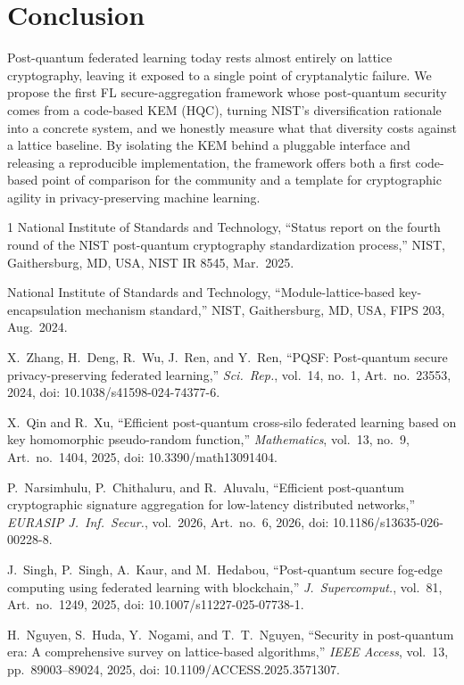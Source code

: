 \documentclass[conference]{IEEEtran}
\begin{document}
\section{Conclusion}
Post-quantum federated learning today rests almost entirely on lattice cryptography,
leaving it exposed to a single point of cryptanalytic failure. We propose the first
FL secure-aggregation framework whose post-quantum security comes from a code-based KEM
(HQC), turning NIST's diversification rationale into a concrete system, and we honestly
measure what that diversity costs against a lattice baseline. By isolating the KEM behind a
pluggable interface and releasing a reproducible implementation, the framework offers both a
first code-based point of comparison for the community and a template for cryptographic
agility in privacy-preserving machine learning.

\begin{thebibliography}{1}
National Institute of Standards and Technology, ``Status report on the fourth round of the
NIST post-quantum cryptography standardization process,'' NIST, Gaithersburg, MD, USA,
NIST IR 8545, Mar.\ 2025.

National Institute of Standards and Technology, ``Module-lattice-based key-encapsulation
mechanism standard,'' NIST, Gaithersburg, MD, USA, FIPS 203, Aug.\ 2024.

X.\ Zhang, H.\ Deng, R.\ Wu, J.\ Ren, and Y.\ Ren, ``PQSF: Post-quantum secure
privacy-preserving federated learning,'' \emph{Sci.\ Rep.}, vol.\ 14, no.\ 1, Art.\ no.\
23553, 2024, doi: 10.1038/s41598-024-74377-6.

X.\ Qin and R.\ Xu, ``Efficient post-quantum cross-silo federated learning based on key
homomorphic pseudo-random function,'' \emph{Mathematics}, vol.\ 13, no.\ 9, Art.\ no.\ 1404,
2025, doi: 10.3390/math13091404.

P.\ Narsimhulu, P.\ Chithaluru, and R.\ Aluvalu, ``Efficient post-quantum cryptographic
signature aggregation for low-latency distributed networks,'' \emph{EURASIP J.\ Inf.\ Secur.},
vol.\ 2026, Art.\ no.\ 6, 2026, doi: 10.1186/s13635-026-00228-8.

J.\ Singh, P.\ Singh, A.\ Kaur, and M.\ Hedabou, ``Post-quantum secure fog-edge computing
using federated learning with blockchain,'' \emph{J.\ Supercomput.}, vol.\ 81, Art.\ no.\
1249, 2025, doi: 10.1007/s11227-025-07738-1.

H.\ Nguyen, S.\ Huda, Y.\ Nogami, and T.\ T.\ Nguyen, ``Security in post-quantum era: A
comprehensive survey on lattice-based algorithms,'' \emph{IEEE Access}, vol.\ 13, pp.\
89003--89024, 2025, doi: 10.1109/ACCESS.2025.3571307.
\end{thebibliography}
\end{document}
